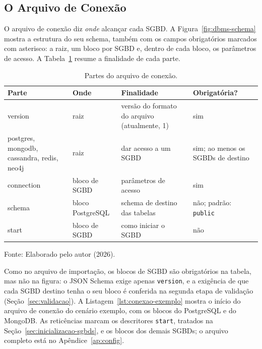 \subsection{O Arquivo de Conexão}
\label{sec:arquivo-conexao}

O arquivo de conexão diz \textit{onde} alcançar cada SGBD. A Figura~\ref{fig:dbms-schema}
mostra a estrutura do seu schema, também com
os campos obrigatórios marcados com asterisco: a raiz, um bloco por SGBD e, dentro de cada
bloco, os parâmetros de acesso. A Tabela~\ref{tab:partes-conexao} resume a finalidade de
cada parte.

\begin{table}[H]
  \caption{Partes do arquivo de conexão.}
  \label{tab:partes-conexao}
  \centering
  \setlength{\tabcolsep}{4pt}
  \begin{tabular}{>{\raggedright\arraybackslash\ttfamily}p{3.5cm} >{\raggedright\arraybackslash}p{2.6cm} >{\raggedright\arraybackslash}p{4.6cm} >{\raggedright\arraybackslash}p{3.6cm}}
    \toprule
    \normalfont\textbf{Parte} & \textbf{Onde} & \textbf{Finalidade} & \textbf{Obrigatória?} \\
    \midrule
    version & raiz & versão do formato do arquivo (atualmente, 1) & sim \\
    postgres, mongodb, cassandra, redis, neo4j & raiz & dar acesso a um SGBD & sim; ao menos os SGBDs de destino \\
    connection & bloco de SGBD & parâmetros de acesso & sim \\
    schema & bloco PostgreSQL & schema de destino das tabelas & não; padrão: \texttt{public} \\
    start & bloco de SGBD & como iniciar o SGBD & não \\
    \bottomrule
  \end{tabular}
  \par\vspace{4pt}
  {\footnotesize Fonte: Elaborado pelo autor (2026).}
\end{table}

Como no arquivo de importação, os blocos de SGBD são obrigatórios na tabela, mas não na
figura: o JSON Schema exige apenas \texttt{version}, e a exigência de que cada SGBD destino
tenha o seu bloco é conferida na segunda etapa de validação (Seção~\ref{sec:validacao}).
A Listagem~\ref{lst:conexao-exemplo} mostra o início do arquivo de conexão do cenário
exemplo, com os blocos do PostgreSQL e do MongoDB. As reticências marcam os descritores
\texttt{start}, tratados na Seção~\ref{sec:inicializacao-sgbds}, e os blocos dos demais
SGBDs; o arquivo completo está no Apêndice~\ref{ap:config}.


